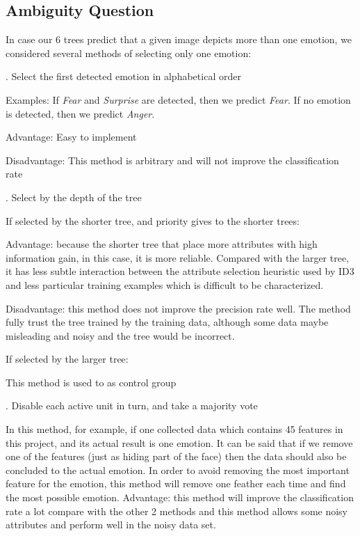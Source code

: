 \documentclass[12pt, a4paper]{article}
\begin{document}
\subsection*{Ambiguity Question}
In case our 6 trees predict that a given image depicts more than one emotion, we considered several methods of selecting only one emotion:\par
{}. Select the first detected emotion in alphabetical order\par
\bigskip
Examples: If \textit{Fear} and \textit{Surprise} are detected, then we predict \textit{Fear}. If no emotion is detected, then we predict \textit{Anger}.\par
Advantage: Easy to implement\par
Disadvantage: This method is arbitrary and will not improve the classification rate\par
{}. Select by the depth of the tree\par
\bigskip
If selected by the shorter tree, and priority gives to the shorter trees:\par
Advantage: because the shorter tree that place more attributes with high information gain, in this case, it is more reliable. Compared with the larger tree, it has less subtle interaction between the attribute selection heuristic used by ID3 and less particular training examples which is difficult to be characterized.\par
Disadvantage: this method does not improve the precision rate well. The method fully trust the tree trained by the training data, although some data maybe misleading and noisy and the tree would be incorrect.\par 
If selected by the larger tree:\par
This method is used to as control group\par
{}. Disable each active unit in turn, and take a majority vote\par
\bigskip
In this method, for example, if one collected data which contains 45 features in this project, and its actual result is one emotion. It can be said that if we remove one of the features (just as hiding part of the face) then the data should also be concluded to the actual emotion. In order to avoid removing the most important feature for the emotion, this method will remove one feather each time and find the most possible emotion.
Advantage: this method will improve the classification rate a lot compare with the other 2 methods and this method allows some noisy attributes and perform well in the noisy data set.\par
\end{document}
